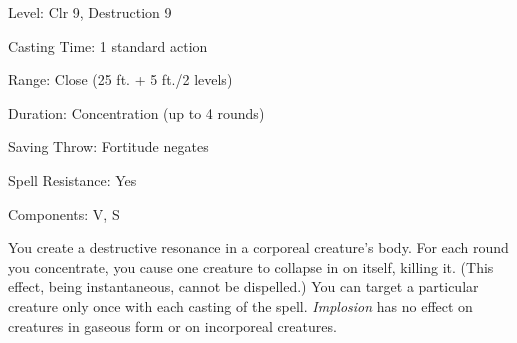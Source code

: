 
\begin{description*}
\item[Level:] Clr 9, Destruction 9
\item[Casting Time:] 1 standard action
\item[Range:] Close (25 ft. + 5 ft./2 levels)
\item[Duration:] Concentration (up to 4 rounds)
\item[Saving Throw:] Fortitude negates
\item[Spell Resistance:] Yes
\item[Components:] V, S
\end{description*}

You create a destructive resonance in a corporeal creature's body. For each round
you concentrate, you cause one creature to collapse in on itself, killing it. (This
effect, being instantaneous, cannot be dispelled.)
You can target a particular creature only once with each casting of the spell.
\textit{Implosion} has no effect on creatures in gaseous form or on incorporeal
creatures.